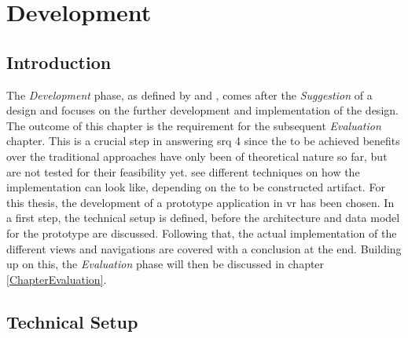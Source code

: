 
\chapter{Development}

\label{ChapterDevelopment}


\section{Introduction}

The \textit{Development} phase, as defined by \cite{Vaishnavi2008} and \cite{Hevner2010}, comes after the \textit{Suggestion} of a design and focuses on the further development and implementation of the design. The outcome of this chapter is the requirement for the subsequent \textit{Evaluation} chapter. This is a crucial step in answering \gls{srq} 4 since the to be achieved benefits over the traditional approaches have only been of theoretical nature so far, but are not tested for their feasibility yet. \cite{Vaishnavi2008} see different techniques on how the implementation can look like, depending on the to be constructed artifact. For this thesis, the development of a prototype application in \gls{vr} has been chosen. In a first step, the technical setup is defined, before the architecture and data model for the prototype are discussed. Following that, the actual implementation of the different views and navigations are covered with a conclusion at the end. \newline
Building up on this, the \textit{Evaluation} phase will then be discussed in chapter \ref{ChapterEvaluation}.



\section{Technical Setup}

